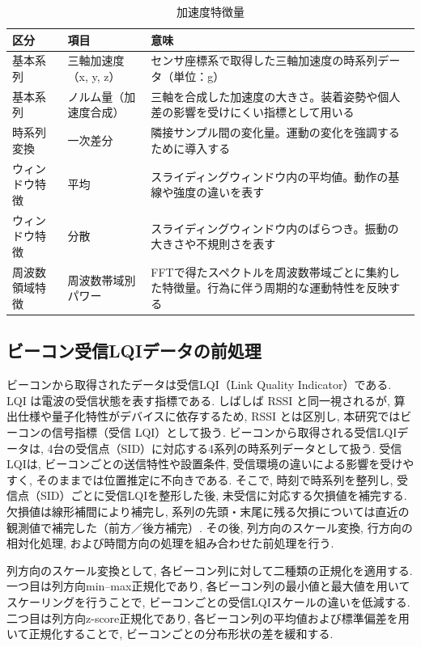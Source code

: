 \documentclass[a4paper,12pt]{jreport}
\begin{document}
\begin{table}[tb]
  \centering
  \caption{加速度特徴量}
  \label{tab:feat_acc}
  \renewcommand{\arraystretch}{1.2}
  \begin{tabularx}{\linewidth}{|p{3.5cm}|p{3.0cm}|X|}
    \hline
    区分 & 項目 & 意味 \\ \hline
    基本系列 & 三軸加速度（x, y, z） & センサ座標系で取得した三軸加速度の時系列データ（単位：g） \\ \hline
    基本系列 & ノルム量（加速度合成） & 三軸を合成した加速度の大きさ。装着姿勢や個人差の影響を受けにくい指標として用いる \\ \hline
    時系列変換 & 一次差分 & 隣接サンプル間の変化量。運動の変化を強調するために導入する \\ \hline
    ウィンドウ特徴 & 平均 & スライディングウィンドウ内の平均値。動作の基線や強度の違いを表す \\ \hline
    ウィンドウ特徴 & 分散 & スライディングウィンドウ内のばらつき。振動の大きさや不規則さを表す \\ \hline
    周波数領域特徴 & 周波数帯域別パワー & FFTで得たスペクトルを周波数帯域ごとに集約した特徴量。行為に伴う周期的な運動特性を反映する \\ \hline
  \end{tabularx}
\end{table}


\subsection{ビーコン受信LQIデータの前処理}
ビーコンから取得されたデータは受信LQI（Link Quality Indicator）である. LQI は電波の受信状態を表す指標である. しばしば RSSI と同一視されるが, 算出仕様や量子化特性がデバイスに依存するため, RSSI とは区別し, 本研究ではビーコンの信号指標（受信 LQI）として扱う. ビーコンから取得される受信LQIデータは, 4台の受信点（SID）に対応する4系列の時系列データとして扱う. 受信LQIは, ビーコンごとの送信特性や設置条件, 受信環境の違いによる影響を受けやすく, そのままでは位置推定に不向きである. そこで, 時刻で時系列を整列し, 受信点（SID）ごとに受信LQIを整形した後, 未受信に対応する欠損値を補完する. 欠損値は線形補間により補完し, 系列の先頭・末尾に残る欠損については直近の観測値で補完した（前方／後方補完）. その後, 列方向のスケール変換, 行方向の相対化処理, および時間方向の処理を組み合わせた前処理を行う. 

列方向のスケール変換として, 各ビーコン列に対して二種類の正規化を適用する. 一つ目は列方向min–max正規化であり, 各ビーコン列の最小値と最大値を用いてスケーリングを行うことで, ビーコンごとの受信LQIスケールの違いを低減する. 二つ目は列方向z-score正規化であり, 各ビーコン列の平均値および標準偏差を用いて正規化することで, ビーコンごとの分布形状の差を緩和する. 
\end{document}
